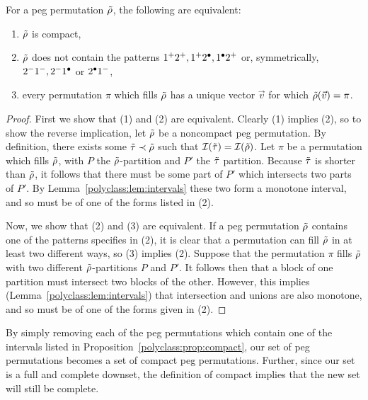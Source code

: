     \begin{proposition}\label{polyclass:prop:compact}
      For a peg permutation $\tilde{\rho}$, the following are equivalent:
      \begin{enumerate}[1)]
      \item $\tilde{\rho}$ is compact, 
      \item $\tilde{\rho}$ does not contain the patterns $1^+ 2^+, 1^+ 2^\bullet, 1^\bullet
        2^+$ or, symmetrically, $2^- 1^-, 2^- 1^\bullet$ or $2^\bullet 1^-$, 
      \item every permutation $\pi$ which fills $\tilde{\rho}$ has a unique vector
        $\vec v$ for which $\tilde{\rho}(\vec v) = \pi$. 
      \end{enumerate}
    \end{proposition}
    \begin{proof}
      First we show that (1) and (2) are equivalent. Clearly (1) implies (2),
      so to show the reverse implication, let $\tilde{\rho}$ be a noncompact peg
      permutation. By definition, there exists some $\tilde{\tau} \prec \tilde{\rho}$ such that
      $\mathcal{I}(\tilde{\tau}) = \mathcal{I}(\tilde{\rho})$. Let $\pi$ be a permutation which fills $\tilde{\rho}$,
      with $P$ the $\tilde{\rho}$-partition and $P'$ the $\tilde{\tau}$ partition. Because
      $\tilde{\tau}$ is shorter than $\tilde{\rho}$, it follows that there must be some part
      of $P'$ which intersects two parts of $P'$. By
      Lemma~\ref{polyclass:lem:intervals} these two form a monotone
      interval, and so must be of one of the forms listed in (2). 

      Now, we show that (2) and (3) are equivalent. If a peg permutation
      $\tilde{\rho}$ contains one of the patterns specifies in (2), it is clear that a
      permutation can fill $\tilde{\rho}$ in at least two different ways, so (3)
      implies (2). Suppose that the permutation $\pi$ fills $\tilde{\rho}$ with two
      different $\tilde{\rho}$-partitions $P$ and $P'$. It follows then that
      a block of one partition must intersect two blocks of the other. However,
      this implies (Lemma~\ref{polyclass:lem:intervals}) that intersection
      and unions are also monotone, and so must be of one of the forms given in
      (2). 
    \end{proof}

    By simply removing each of the peg permutations which contain one of the
    intervals listed in Proposition~\ref{polyclass:prop:compact}, our set of
    peg permutations becomes a set of compact peg permutations. Further, since
    our set is a full and complete downset, the definition of compact implies
    that the new set will still be complete. 

